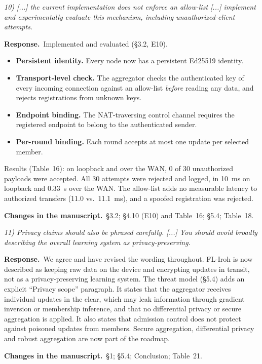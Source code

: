 \documentclass[11pt,a4paper]{article}
\newenvironment{comment}{\par\medskip\noindent\begin{minipage}{\linewidth}\color{blue!45!black}\itshape}{\end{minipage}\par}
\newcommand{\reply}{\par\smallskip\noindent\textbf{Response.}~}
\newcommand{\changes}{\par\smallskip\noindent\textbf{Changes in the manuscript.}~}
\begin{document}
\begin{comment}
10) [...] the current implementation does not enforce an allow-list [...] implement and experimentally evaluate this mechanism, including unauthorized-client attempts.
\end{comment}
\reply Implemented and evaluated (\S3.2, E10).
\begin{itemize}[leftmargin=1.3em,itemsep=0.1em]
\item \textbf{Persistent identity.} Every node now has a persistent Ed25519 identity.
\item \textbf{Transport-level check.} The aggregator checks the authenticated key of every incoming connection against an allow-list \emph{before} reading any data, and rejects registrations from unknown keys.
\item \textbf{Endpoint binding.} The NAT-traversing control channel requires the registered endpoint to belong to the authenticated sender.
\item \textbf{Per-round binding.} Each round accepts at most one update per selected member.
\end{itemize}
Results (Table~16): on loopback and over the WAN, 0 of 30 unauthorized payloads were accepted. All 30 attempts were rejected and logged, in 10~ms on loopback and 0.33~s over the WAN. The allow-list adds no measurable latency to authorized transfers (11.0 vs.\ 11.1~ms), and a spoofed registration was rejected.

\changes \S3.2; \S4.10 (E10) and Table~16; \S5.4; Table~18.

\begin{comment}
11) Privacy claims should also be phrased carefully. [...] You should avoid broadly describing the overall learning system as privacy-preserving.
\end{comment}
\reply We agree and have revised the wording throughout. FL-Iroh is now described as keeping raw data on the device and encrypting updates in transit, not as a privacy-preserving learning system. The threat model (\S5.4) adds an explicit ``Privacy scope'' paragraph. It states that the aggregator receives individual updates in the clear, which may leak information through gradient inversion or membership inference, and that no differential privacy or secure aggregation is applied. It also states that admission control does not protect against poisoned updates from members. Secure aggregation, differential privacy and robust aggregation are now part of the roadmap.

\changes \S1; \S5.4; Conclusion; Table~21.
\end{document}
